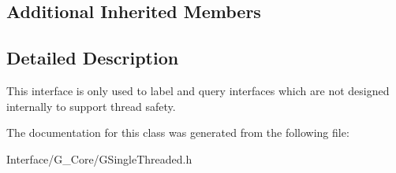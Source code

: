 \subsection*{Additional Inherited Members}


\subsection{Detailed Description}
This interface is only used to label and query interfaces which are not designed internally to support thread safety. 

The documentation for this class was generated from the following file\+:\begin{DoxyCompactItemize}
\item 
Interface/\+G\+\_\+\+Core/G\+Single\+Threaded.\+h\end{DoxyCompactItemize}

